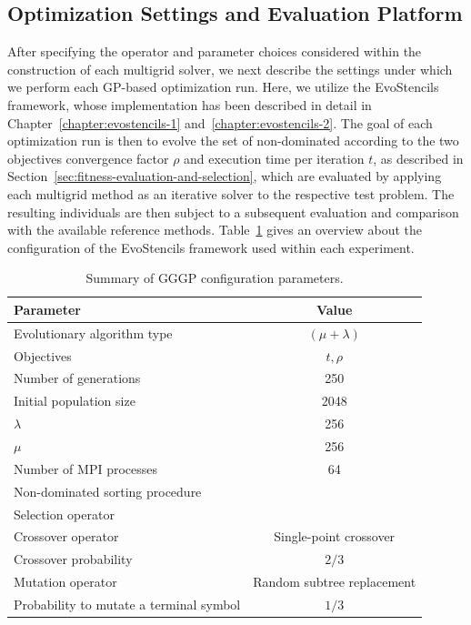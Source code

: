 \subsection{Optimization Settings and Evaluation Platform}
\label{sec:optimization-settings}
After specifying the operator and parameter choices considered within the construction of each multigrid solver, we next describe the settings under which we perform each GP-based optimization run.
Here, we utilize the EvoStencils framework, whose implementation has been described in detail in Chapter~\ref{chapter:evostencils-1} and~\ref{chapter:evostencils-2}.
The goal of each optimization run is then to evolve the set of non-dominated according to the two objectives convergence factor $\rho$ and execution time per iteration $t$, as described in Section~\ref{sec:fitness-evaluation-and-selection}, which are evaluated by applying each multigrid method as an iterative solver to the respective test problem.
The resulting individuals are then subject to a subsequent evaluation and comparison with the available reference methods. 
Table~\ref{table:gp-parameters} gives an overview about the configuration of the EvoStencils framework used within each experiment.
\begin{table}
	\centering
	\caption{Summary of GGGP configuration parameters.}
	\label{table:gp-parameters}
	\begin{tabular}{l c}
		\toprule
		Parameter & Value \\
		\midrule 
		Evolutionary algorithm type & $(\mu + \lambda)$ \\
		\midrule
		Objectives & $t, \rho$ \\
		\midrule
		Number of generations & 250 \\
		\midrule
		Initial population size & 2048 \\
		\midrule
		$\lambda$ & 256 \\
		\midrule
		$\mu$ & 256 \\
		\midrule
		Number of MPI processes & 64 \\
		\midrule
		Non-dominated sorting procedure & \cite{deb2002fast} \\ 
		\midrule
		Selection operator & \cite{deb2002fast} \\ 
		\midrule
		Crossover operator & Single-point crossover \\
		\midrule
		Crossover probability & $2/3$ \\
		\midrule
		Mutation operator & Random subtree replacement \\
		\midrule 
		Probability to mutate a terminal symbol & $1/3$ \\
		\bottomrule
	\end{tabular}
\end{table}
